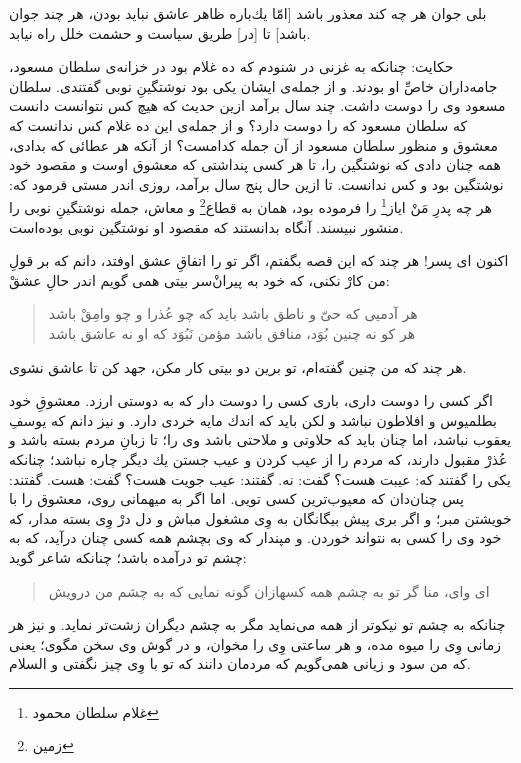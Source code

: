 بلى جوان هر چه كند معذور باشد [امّا يك‌باره ظاهر عاشق نبايد بودن، هر چند جوان باشد] تا [در] طريق سياست و حشمت خلل راه نيابد.

حكايت: چنانكه به غزنى در شنودم كه ده غلام بود در خزانه‌ی سلطان مسعود، جامه‌داران خاصِّ او بودند. و از جمله‌ی ايشان يكى بود نوشتگينِ نوبى گفتندى. سلطان مسعود وى را دوست داشت. چند سال برآمد ازين حديث كه هيچ كس نتوانست دانست كه سلطان مسعود كه را دوست دارد؟ و از جمله‌ی اين ده غلام كس ندانست كه معشوق و منظور سلطان مسعود از آن جمله كدامست‌؟ از آنكه هر عطائى كه بدادى، همه چنان دادى كه نوشتگين را، تا هر كسى پنداشتى كه معشوق اوست و مقصود خود نوشتگين بود و كس ندانست. تا ازين حال پنج سال برآمد، روزى اندر مستى فرمود كه: هر چه پدرِ مَنْ اياز\footnote{غلام سلطان محمود} را فرموده بود، همان به قطاع\footnote{زمین} و معاش، جمله نوشتگينِ‌ نوبى را منشور نبيسند. آنگاه بدانستند كه مقصود او نوشتگين نوبى بوده‌است.

اكنون اى پسر! هر چند كه اين قصه بگفتم، اگر تو را اتفاقِ عشق اوفتد، دانم كه بر قولِ من كارْ نكنى، كه خود به پيران‌ْسر بيتى همى گويم اندر حالِ عشقْ:

\begin{quote}
\centering
هر آدميى كه حىّ و ناطق باشد \quad \quad بايد كه چو عُذرا و چو وامِقْ باشد\\
هر كو نه چنين بُوَد، منافق باشد \quad \quad مؤمن نَبُوَد كه او نه عاشق باشد
\end{quote}

هر چند كه من چنين گفته‌ام، تو برين دو بيتى كار مكن، جهد كن تا عاشق نشوى.


اگر كسى را دوست دارى، بارى كسى را دوست دار كه به دوستى ارزد. معشوقِ خود بطلميوس و افلاطون نباشد و لكن بايد كه اندك مايه خردى دارد. و نيز دانم كه يوسفِ يعقوب نباشد، اما چنان بايد كه حلاوتى و ملاحتى باشد وى را؛ تا زبانِ مردم بسته باشد و عُذرْ مقبول دارند، كه مردم را از عيب كردن و عيب جستن يك ديگر چاره نباشد؛ چنانكه يكى را گفتند كه: عيبت هست‌؟ گفت: نه. گفتند: عيب جويت هست‌؟ گفت: هست. گفتند: پس چنان‌دان كه معيوب‌ترين كسى تويى. اما اگر به ميهمانى روى، معشوق را با خويشتن مبر؛ و اگر برى پيش بيگانگان به وِى مشغول مباش و دل درْ وِى بسته مدار، كه خود وى را كسى به نتواند خوردن. و مپندار كه وى بچشم همه كسى چنان درآيد، كه به چشم تو درآمده باشد؛ چنانكه شاعر گويد:

\begin{quote}
\centering
اى واى، منا گر تو به چشم همه كسها\quad \quad زان گونه نمايى كه به چشم من درويش\\
\end{quote}
چنانكه به چشم تو نيكوتر از همه مى‌نمايد مگر به چشم ديگران زشت‌تر نمايد. و نيز هر زمانى وِى را ميوه مده، و هر ساعتى وِى را مخوان، و در گوش وى سخن مگوى؛ يعنى كه من سود و زيانى همى‌گويم كه مردمان دانند كه تو با وِى چيز نگفتى و السلام.

\newpage


























